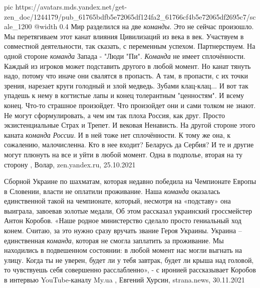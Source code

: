 \ifcmt
   pic https://avatars.mds.yandex.net/get-zen_doc/1244179/pub_61765bdfb5e72065df124fa2_61766cf4b5e72065df2695c7/scale_1200
	 @width 0.4
\fi
Мир разделился на две \emph{команды}. Это не сейчас произошло. Мы перетягиваем этот
канат влияния Цивилизаций из века в век. Участвуем в совместной деятельности,
так сказать, с переменным успехом. Партнерствуем.  На одной стороне
\emph{команда} Запада - "Люди "Пи". \emph{Команда} не имеет сплочённости.
Каждый из игроков может подставить другого в любой момент. Но канат тянуть
надо, потому что иначе они свалятся в пропасть. А там, в пропасти, с их точки
зрения, нарезает круги голодный и злой медведь. Зубами клац-клац... И вот так
упадешь к нему в когтистые лапы и конец толерантным "ценностям". И всему конец.
Что-то страшное произойдет. Что произойдет они и сами толком не знают. Не могут
сформулировать, а чем им так плоха Россия, как друг. Просто экзистенциальные
Страх и Трепет. И вековая Ненависть.  На другой стороне этого каната
\emph{команда России}. И в ней тоже нет сплочённости. К тому же она, к
сожалению, малочисленна. Кто в нее входит? Беларусь да Сербия? И те и другие
могут плюнуть на все и уйти в любой момент. Одна в подполье, вторая на ту
сторону
, Волар, zen.yandex.ru, 25.10.2021

Сборной Украине по шахматам, которая недавно победила на Чемпионате Европы в
Словении, власти не оплатили проживание.  Наша \emph{команда} оказалась
единственной такой на чемпионате, который, несмотря на «подставу» она выиграла,
завоевав золотые медали, Об этом рассказал украинский гроссмейстер Антон
Коробов.  «Наше родное министерство сделало просто гениальный ход конем.
Считаю, за это нужно сразу вручать звание Героя Украины. Украина – единственная
\emph{команда}, которая не смогла заплатить за проживание. Мы находились в
подвешенном состоянии: в любой момент нас могли выгнать на улицу. Когда ты не
уверен, будет ли у тебя завтрак, будет ли крыша над головой, то чувствуешь себя
совершенно расслабленно», - с иронией рассказывает Коробов в интервью
YouTube-каналу My.ua
, 
Евгений Хурсин, strana.news, 30.11.2021
